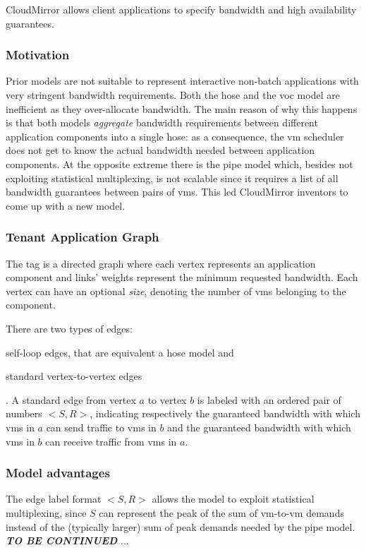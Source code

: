 CloudMirror \cite{cloudmirror} allows client applications to specify bandwidth and high availability guarantees.

\subsubsection{Motivation} \label{why_tag}
Prior models are not suitable to represent interactive non-batch applications with very stringent bandwidth requirements.
Both the hose and the \gls{voc} model are inefficient as they over-allocate bandwidth.
The main reason of why this happens is that both models \textit{aggregate} bandwidth requirements between different application components into a single hose: as a consequence, the \gls{vm} scheduler does not get to know the actual bandwidth needed between application components.
At the opposite extreme there is the pipe model which, besides not exploiting statistical multiplexing, is not scalable since it requires a list of all bandwidth guarantees between pairs of \glspl{vm}.
This led CloudMirror \cite{cloudmirror} inventors to come up with a new model.

\subsubsection{Tenant Application Graph} \label{tag_description}
The \gls{tag} is a directed graph where each vertex represents an application component and links' weights represent the minimum requested bandwidth. Each vertex can have an optional \textit{size}, denoting the number of \glspl{vm} belonging to the component.\par
There are two types of edges:
\begin{mylist}
    \item self-loop edges, that are equivalent a hose model and
    \item standard vertex-to-vertex edges
\end{mylist}.
A standard edge from vertex $a$ to vertex $b$ is labeled with an ordered pair of numbers $<S, R>$, indicating respectively the guaranteed bandwidth with which \glspl{vm} in $a$ can send traffic to \glspl{vm} in $b$ and the guaranteed bandwidth with which \glspl{vm} in $b$ can receive traffic from \glspl{vm} in $a$.

\subsubsection{Model advantages}
The edge label format $<S, R>$ allows the model to exploit statistical multiplexing, since $S$ can represent the peak of the sum of \gls{vm}-to-\gls{vm} demands instead of the (typically larger) sum of peak demands needed by the pipe model.
\textbf{\textit{TO BE CONTINUED}} ...


